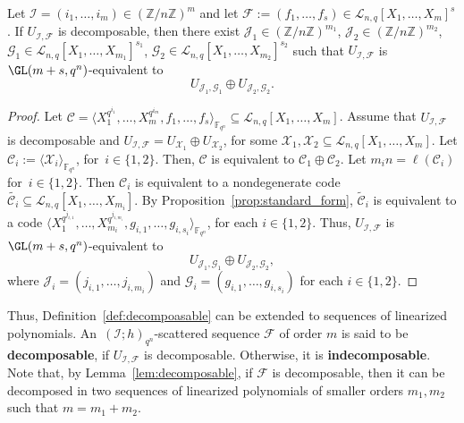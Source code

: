 \begin{lemma}\label{lem:decomposable}
    Let $\mathcal I=(i_1,\ldots,i_m)\in(\mathbb{Z}/n\mathbb{Z})^m$ and let $\mathcal{F}:=(f_1,\ldots,f_s)\in\mathcal{L}_{n,q}[X_1,\ldots,X_m]^s$.
    If $U_{\mathcal I,\mathcal F}$ is decomposable, then there exist $\mathcal J_1 \in (\mathbb{Z}/n\mathbb{Z})^{m_1}$, $\mathcal J_2 \in (\mathbb{Z}/n\mathbb{Z})^{m_2}$, $\mathcal G_1\in\mathcal{L}_{n,q}[X_1,\ldots,X_{m_1}]^{s_1}$, $\mathcal G_2\in\mathcal{L}_{n,q}[X_{1},\ldots,X_{m_2}]^{s_2}$ such that $U_{\mathcal I,\mathcal F}$ is $\GL(m+s,q^n)$-equivalent to
    $$ U_{\mathcal J_1,\mathcal G_1}\oplus U_{\mathcal J_2,\mathcal G_2}.$$
\end{lemma}
\begin{proof}
    Let $\mathcal{C}=\langle X_1^{q^{i_1}},\ldots,X_m^{q^{i_m}},f_1,\ldots,f_s\rangle_{{\mathbb F}_{q^n}}\subseteq \mathcal{L}_{n,q}[X_1,\ldots,X_m]$. Assume that $U_{\mathcal I,\mathcal F}$ is decomposable and $U_{\mathcal I,\mathcal F}=U_{\mathcal X_1}\oplus U_{\mathcal X_2}$,
    for some $\mathcal X_1, \mathcal X_2\subseteq \mathcal{L}_{n,q}[X_1,\ldots,X_m]$. Let $\mathcal{C}_i:=\langle \mathcal X_i\rangle_{{\mathbb F}_{q^n}}$, for~$i\in\{1,2\}$. Then, $\mathcal{C}$ is equivalent to $\mathcal{C}_1\oplus \mathcal{C}_2$. Let $m_in=\ell(\mathcal{C}_i)$ for~$i\in\{1,2\}$. Then $\mathcal{C}_i$ is equivalent to a nondegenerate code $\tilde{\mathcal{C}_i}\subseteq \mathcal{L}_{n,q}[X_1,\ldots,X_{m_i}]$. By Proposition~\ref{prop:standard_form}, $\tilde{\mathcal{C}}_i$ is equivalent to a code $\langle X_1^{q^{j_{i,1}}},\ldots,X_{m_i}^{q^{j_{i,m_i}}},g_{i,1},\ldots,g_{i,s_i}\rangle_{{\mathbb F}_{q^n}}$, for each $i\in\{1,2\}$. Thus, 
    $ U_{\mathcal I,\mathcal F}$ is $\GL(m+s,q^n)$-equivalent to $$U_{\mathcal J_1,\mathcal G_1}\oplus U_{\mathcal J_2,\mathcal G_2},$$
    where $\mathcal J_i=(j_{i,1},\ldots,j_{i,m_i})$ and $\mathcal G_i=(g_{i,1},\ldots,g_{i,s_i})$ for each $i\in\{1,2\}$. 
\end{proof}

Thus, Definition~\ref{def:decompoasable} can be extended to sequences of linearized polynomials. An~$(\mathcal I;h)_{q^n}$-scattered sequence $\mathcal F$ of order $m$ is said to be \textbf{decomposable}, if $U_{\mathcal I,\mathcal F}$ is decomposable. Otherwise, it is \textbf{indecomposable}. Note that, by Lemma~\ref{lem:decomposable}, if  $\mathcal F$ is decomposable, then it can be decomposed in two sequences of linearized polynomials of smaller orders $m_1,m_2$ such that $m=m_1+m_2$.

